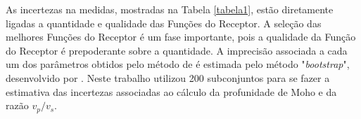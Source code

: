 As incertezas na medidas, mostradas na Tabela \ref{tabela1}, estão diretamente ligadas a quantidade e qualidade das Funções do Receptor. A seleção das melhores Funções do Receptor é um fase importante, pois a qualidade da Função do Receptor é prepoderante sobre a quantidade. A imprecisão associada a cada um dos parâmetros obtidos pelo método de \cite{Zhu_Kanamori_2000} é estimada pelo método "\textit{bootstrap}", desenvolvido por \cite{efron_statistical_1991}. Neste trabalho utilizou 200  subconjuntos para se fazer a estimativa das incertezas associadas ao  cálculo da profunidade de Moho e da razão $v_{p}/v_{s}$.



